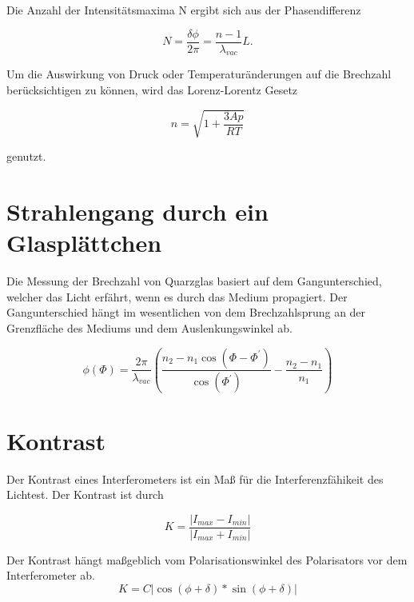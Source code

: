 Die Anzahl der Intensitätsmaxima N ergibt sich aus der Phasendifferenz

\begin{equation}
N=\frac{\delta \phi}{2 \pi} = \frac{n-1}{\lambda_{vac}} L.
\end{equation}

Um die Auswirkung von Druck oder Temperaturänderungen auf die Brechzahl berücksichtigen zu können, wird das Lorenz-Lorentz Gesetz

\begin{equation}
	n = \sqrt{1 + \frac{3Ap}{RT}}
\end{equation}

genutzt.

\section{Strahlengang durch ein Glasplättchen}


Die Messung der Brechzahl von Quarzglas basiert auf dem Gangunterschied, welcher das Licht erfährt, wenn es durch das Medium propagiert.
Der Gangunterschied hängt im wesentlichen von dem Brechzahlsprung an der Grenzfläche des Mediums und dem Auslenkungswinkel ab.

\begin{equation}
\phi(\Phi) = \frac{2 \pi}{\lambda_{vac}} \left( \frac{n_2 - n_1 \cos(\Phi - \Phi^')}{\cos(\Phi^')} - \frac{n_2 - n_1}{n_1}\right)
\end{equation}

\section{Kontrast}
Der Kontrast eines Interferometers ist ein Maß für die Interferenzfähikeit des Lichtest. Der Kontrast ist durch

\begin{equation}
K = \frac{|I_{max} - I_{min}|}{|I_{max} + I_{min}|}
\end{equation}

Der Kontrast hängt maßgeblich vom Polarisationswinkel des Polarisators vor dem Interferometer ab.
\begin{equation}
K = C|\cos(\phi + \delta) * \sin(\phi + \delta)|
\end{equation}